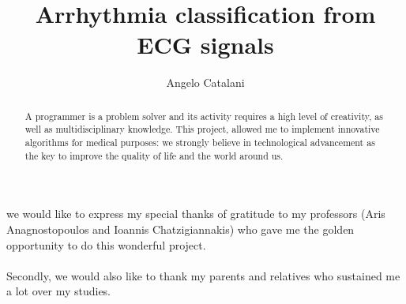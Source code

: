 \documentclass[LaM,binding=0.6cm]{sapthesis}
\title{Arrhythmia classification from ECG signals}
\author{Angelo Catalani}
\begin{document}
\frontmatter

\maketitle

\dedication{Dedicated to\\ my parents}

\begin{abstract}
A programmer is a problem solver and its activity requires a high level of creativity, as well as multidisciplinary knowledge. This project, allowed me to implement innovative algorithms for medical purposes: we strongly believe in technological advancement as the key to improve the quality of life and the world around us.
\end{abstract}

\begin{acknowledgments}
we would like to express my special thanks of gratitude to my professors (Aris Anagnostopoulos and Ioannis Chatzigiannakis) who gave me the golden opportunity to do this wonderful project.\\\\Secondly, we would also like to thank my parents and relatives who sustained me a lot over my studies.
\end{acknowledgments}

\tableofcontents


\mainmatter
\end{document}
